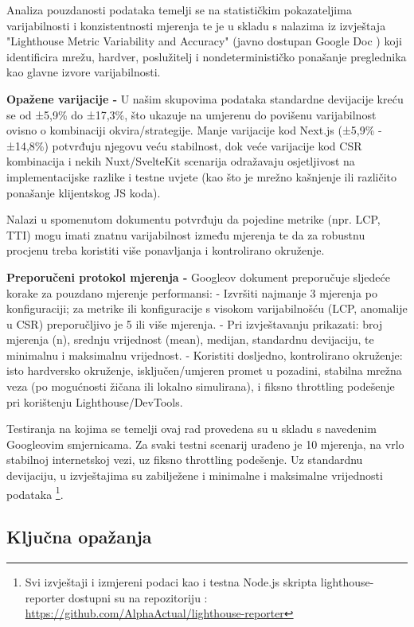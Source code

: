 Analiza pouzdanosti podataka temelji se na statističkim pokazateljima varijabilnosti i konzistentnosti mjerenja te je u skladu s nalazima iz izvještaja "Lighthouse Metric Variability and Accuracy" (javno dostupan Google Doc \cite{lh_variability2025}) koji identificira mrežu, hardver, poslužitelj i nondeterminističko ponašanje preglednika kao glavne izvore varijabilnosti.

\textbf{Opažene varijacije -} U našim skupovima podataka standardne devijacije kreću se od ±5,9\% do ±17,3\%, što ukazuje na umjerenu do povišenu varijabilnost ovisno o kombinaciji okvira/strategije. Manje varijacije kod Next.js (±5,9\% - ±14,8\%) potvrđuju njegovu veću stabilnost, dok veće varijacije kod CSR kombinacija i nekih Nuxt/SvelteKit scenarija odražavaju osjetljivost na implementacijske razlike i testne uvjete (kao što je mrežno kašnjenje ili različito ponašanje klijentskog JS koda).

Nalazi u spomenutom dokumentu potvrđuju da pojedine metrike (npr. LCP, TTI) mogu imati znatnu varijabilnost između mjerenja te da za robustnu procjenu treba koristiti više ponavljanja i kontrolirano okruženje.

\textbf{Preporučeni protokol mjerenja -}
Googleov dokument \cite{lh_variability2025} preporučuje sljedeće korake za pouzdano mjerenje performansi:
- Izvršiti najmanje 3 mjerenja po konfiguraciji; za metrike ili konfiguracije s visokom varijabilnošću (LCP, anomalije u CSR) preporučljivo je 5 ili više mjerenja.
- Pri izvještavanju prikazati: broj mjerenja (n), srednju vrijednost (mean), medijan, standardnu devijaciju, te minimalnu i maksimalnu vrijednost.
- Koristiti dosljedno, kontrolirano okruženje: isto hardversko okruženje, isključen/umjeren promet u pozadini, stabilna mrežna veza (po mogućnosti žičana ili lokalno simulirana), i fiksno throttling podešenje pri korištenju Lighthouse/DevTools.

Testiranja na kojima se temelji ovaj rad  provedena su u skladu s navedenim Googleovim smjernicama. Za svaki testni scenarij urađeno je 10 mjerenja, na vrlo stabilnoj internetskoj vezi, uz fiksno throttling podešenje. Uz standardnu devijaciju, u izvještajima su zabilježene i minimalne i maksimalne vrijednosti podataka \footnote{Svi izvještaji i izmjereni podaci kao i testna Node.js skripta lighthouse-reporter dostupni su na repozitoriju : \url{https://github.com/AlphaActual/lighthouse-reporter}}.


\subsection{Ključna opažanja}

